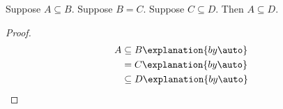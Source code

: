 

\begin{proposition}\label{phase7_composition_direct}
    Suppose $A\subseteq B$.
    Suppose $B=C$.
    Suppose $C\subseteq D$.
    Then $A\subseteq D$.
\end{proposition}
\begin{proof}
    \begin{align*}
        A
            &\subseteq B
                \explanation{by \auto}
                \\
            &= C
                \explanation{by \auto}
                \\
            &\subseteq D
                \explanation{by \auto}
    \end{align*}
\end{proof}
